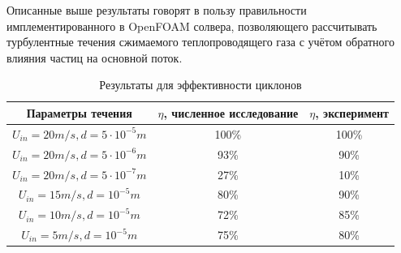 Описанные выше результаты говорят в пользу правильности имплементированного в OpenFOAM солвера, позволяющего рассчитывать турбулентные течения сжимаемого теплопроводящего газа с учётом обратного влияния частиц на основной поток.
\begin{center}
	\begin{table}[h]
		\caption{Результаты для эффективности циклонов}
		\label{tableSolution}
		\begin{tabular}{|c|c|c|}
			\hline
			Параметры течения & $\eta$, численное исследование & $\eta$, эксперимент \\
			\hline
			$U_{in}=20m/s, d=5 \cdot 10^{-5}m$ & 100\% & 100\% \\
			\hline
			$U_{in}=20m/s, d=5 \cdot 10^{-6}m$ & 93\% & 90\%\\
			\hline
			$U_{in}=20m/s, d=5 \cdot 10^{-7}m$ & 27\% & 10\%\\
			\hline
			$U_{in}=15m/s, d=10^{-5}m$ & 80\% & 90\% \\
			\hline
			$U_{in}=10m/s, d=10^{-5}m$ & 72\% & 85\% \\
			\hline
			$U_{in}=5m/s, d=10^{-5}m$ & 75\% & 80\% \\
			\hline
		\end{tabular}
		\vspace{-1em}
	\end{table}
\end{center}
